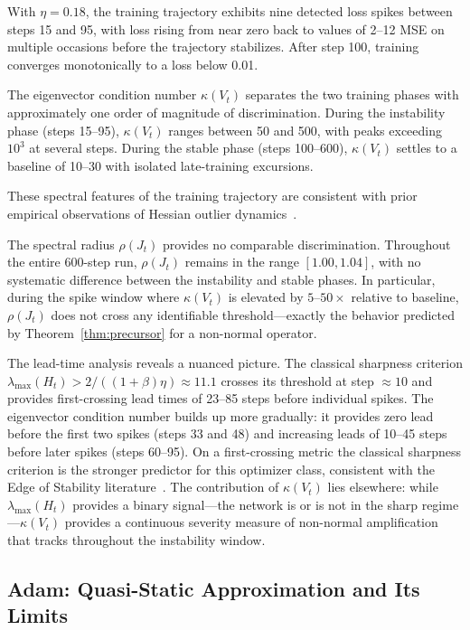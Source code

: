\documentclass[aps,prresearch,twocolumn,superscriptaddress,longbibliography]{revtex4-2}
\begin{document}
With $\eta = 0.18$, the training trajectory exhibits nine detected loss
spikes between steps 15 and 95, with loss rising from near zero back to
values of 2--12 MSE on multiple occasions before the trajectory
stabilizes.
After step 100, training converges monotonically to a loss below 0.01.

The eigenvector condition number $\kappa(V_t)$ separates the two
training phases with approximately one order of magnitude of
discrimination.
During the instability phase (steps 15--95), $\kappa(V_t)$ ranges
between 50 and 500, with peaks exceeding $10^3$ at several steps.
During the stable phase (steps 100--600), $\kappa(V_t)$ settles to a
baseline of 10--30 with isolated late-training excursions.

These spectral features of the training trajectory are consistent
with prior empirical observations of Hessian outlier dynamics~\cite{ghorbani2019,zhang2024}.

The spectral radius $\rho(J_t)$ provides no comparable discrimination.
Throughout the entire 600-step run, $\rho(J_t)$ remains in the range
$[1.00, 1.04]$, with no systematic difference between the instability
and stable phases.
In particular, during the spike window where $\kappa(V_t)$ is elevated
by $5$--$50\times$ relative to baseline, $\rho(J_t)$ does not cross any
identifiable threshold---exactly the behavior predicted by
Theorem~\ref{thm:precursor} for a non-normal operator.

The lead-time analysis reveals a nuanced picture.
The classical sharpness criterion
$\lambda_{\max}(H_t) > 2/((1+\beta)\eta) \approx 11.1$
crosses its threshold at step $\approx 10$ and provides first-crossing
lead times of 23--85 steps before individual spikes.
The eigenvector condition number builds up more gradually: it provides
zero lead before the first two spikes (steps 33 and 48) and increasing
leads of 10--45 steps before later spikes (steps 60--95).
On a first-crossing metric the classical sharpness criterion is the
stronger predictor for this optimizer class, consistent with the Edge of
Stability literature~\cite{cohen2022,damian2023}.
The contribution of $\kappa(V_t)$ lies elsewhere: while
$\lambda_{\max}(H_t)$ provides a binary signal---the network is or is
not in the sharp regime---$\kappa(V_t)$ provides a continuous severity
measure of non-normal amplification that tracks throughout the
instability window.

\subsection{Adam: Quasi-Static Approximation and Its Limits}
\end{document}
